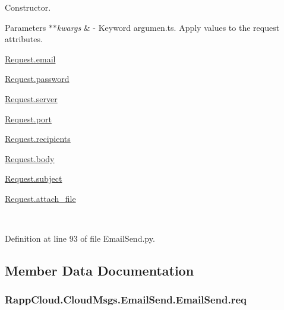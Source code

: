 Constructor. 


\begin{DoxyParams}{Parameters}
{\em $\ast$$\ast$kwargs} & -\/ Keyword argumen.\-ts. Apply values to the request attributes.
\begin{DoxyItemize}
\item \hyperlink{classRappCloud_1_1CloudMsgs_1_1EmailSend_1_1EmailSend_1_1Request_acd47a0fab97f1bf655d847cf5bc037f4}{Request.\-email}
\item \hyperlink{classRappCloud_1_1CloudMsgs_1_1EmailSend_1_1EmailSend_1_1Request_afafc9e4063bae627f3ef8734b5d43616}{Request.\-password}
\item \hyperlink{classRappCloud_1_1CloudMsgs_1_1EmailSend_1_1EmailSend_1_1Request_aba5bc698fee8c97a97016f5f7b089915}{Request.\-server}
\item \hyperlink{classRappCloud_1_1CloudMsgs_1_1EmailSend_1_1EmailSend_1_1Request_ac4521e1068c1e634c76ee75be1c015d0}{Request.\-port}
\item \hyperlink{classRappCloud_1_1CloudMsgs_1_1EmailSend_1_1EmailSend_1_1Request_ab69762f74d75ce786fe0a1b6a0878f6d}{Request.\-recipients}
\item \hyperlink{classRappCloud_1_1CloudMsgs_1_1EmailSend_1_1EmailSend_1_1Request_a9abafdaac60f40b3183e8938dca5108a}{Request.\-body}
\item \hyperlink{classRappCloud_1_1CloudMsgs_1_1EmailSend_1_1EmailSend_1_1Request_aab66642bb7ce90b5338434726cd5ec95}{Request.\-subject}
\item \hyperlink{classRappCloud_1_1CloudMsgs_1_1EmailSend_1_1EmailSend_1_1Request_a6efac2c1a3e5576310bb7fc4f28b3dff}{Request.\-attach\-\_\-file} 
\end{DoxyItemize}\\
\hline
\end{DoxyParams}


Definition at line 93 of file Email\-Send.\-py.



\subsection{Member Data Documentation}
\hypertarget{classRappCloud_1_1CloudMsgs_1_1EmailSend_1_1EmailSend_acd085ce1cafcf521ccf9b42373552b86}{
\subsubsection[{req}]{\setlength{\rightskip}{0pt plus 5cm}Rapp\-Cloud.\-Cloud\-Msgs.\-Email\-Send.\-Email\-Send.\-req}}\label{classRappCloud_1_1CloudMsgs_1_1EmailSend_1_1EmailSend_acd085ce1cafcf521ccf9b42373552b86}


